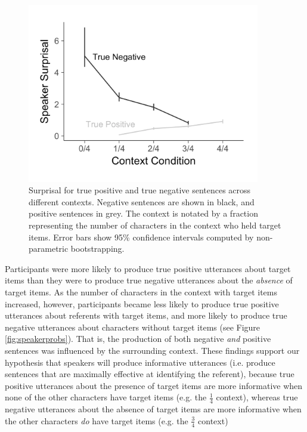 \documentclass[man, noapacite]{apa2}
\begin{document}
\begin{figure}[t]
\begin{center} 
\includegraphics[width=4in]{figures/surprisals_mod2.pdf}
\caption{\label{fig:speakersurprise} Surprisal for true positive and true negative sentences across different contexts. Negative sentences are shown in black, and positive sentences in grey.  The context is notated by a fraction representing the number of characters in the context who held target items. Error bars show 95\% confidence intervals computed by non-parametric bootstrapping.  }
\end{center} 
\end{figure}

Participants were more likely to produce true positive utterances about target items than they were to produce true negative utterances about the \emph{absence} of target items. As the number of characters in the context with target items increased, however, participants became less likely to produce true positive utterances about referents with target items, and more likely to produce true negative utterances about characters without target items (see Figure \ref{fig:speakerprobs}). That is, the production of both negative \emph{and} positive sentences was influenced by the surrounding context. These findings support our hypothesis that speakers will produce informative utterances (i.e. produce sentences that are maximally effective at identifying the referent), because true positive utterances about the presence of target items are more informative when none of the other characters have target items (e.g. the $\frac{1}{4}$ context), whereas true negative utterances about the absence of target items are more informative when the other characters \emph{do} have target items (e.g. the $\frac{3}{4}$ context)
\end{document}
